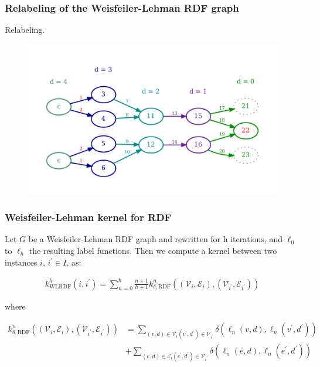 \documentclass{beamer}
\begin{document}
\begingroup
\small
\begin{frame}
\frametitle{Relabeling of the Weisfeiler-Lehman RDF graph}

Relabeling.

\begin{center}
\begin{figure}
\includegraphics[width=\textwidth,keepaspectratio]{img/07-relabeled}
\end{figure}
\end{center}

\end{frame}
\endgroup


\begingroup
\small
\begin{frame}
\frametitle{Weisfeiler-Lehman kernel for RDF}

\begin{definition}
Let $G$ be a Weisfeiler-Lehman RDF graph and rewritten for h iterations, and $\ell_0$ to $\ell_h$ the resulting label functions. Then we compute a kernel between two instances $i$, $i^\prime \in I$, as:

\begin{align}
k_{\mathrm{WLRDF}}^{h}\left(i, i^{\prime}\right)=\sum_{n=0}^{h} \frac{n+1}{h+1} k_{\delta, \mathrm{RDF}}^{n}\left(\left(\mathcal{V}_{i}, \mathcal{E}_{i}\right),\left(\mathcal{V}_{i^{\prime}}, \mathcal{E}_{i^{\prime}}\right)\right)
\end{align}

where

\begin{align}
k_{\delta, \mathrm{RDF}}^{n}\left(\left(\mathcal{V}_{i}, \mathcal{E}_{i}\right),\left(\mathcal{V}_{i^{\prime}}, \mathcal{E}_{i^{\prime}}\right)\right) &=\sum_{(v, d) \in \mathcal{V}_{i}\left(v^{\prime}, d^{\prime}\right) \in \mathcal{V}_{i^{\prime}}} \delta\left(\ell_{n}(v, d), \ell_{n}\left(v^{\prime}, d^{\prime}\right)\right) \\
&+\sum_{(e, d) \in \mathcal{E}_{i}\left(c^{\prime}, d^{\prime}\right) \in \mathcal{V}_{i^{\prime}}} \delta\left(\ell_{n}(e, d), \ell_{n}\left(e^{\prime}, d^{\prime}\right)\right)
\end{align}

\end{definition}

\end{frame}
\endgroup
\end{document}
